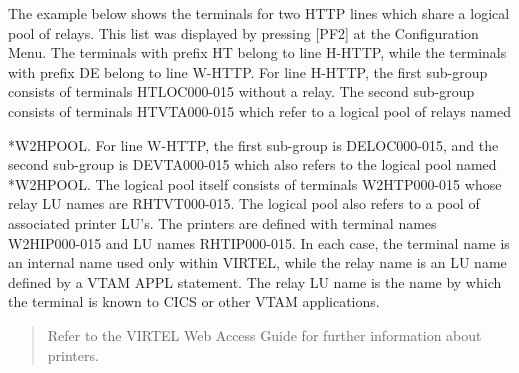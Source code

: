 \documentclass[letterpaper,10pt,english]{sphinxmanual}
\begin{document}
The example below shows the terminals for two HTTP lines which share a logical pool of relays. This list was displayed by pressing {[}PF2{]} at the Configuration Menu. The terminals with prefix HT belong to line H-HTTP, while the terminals with prefix DE belong to line W-HTTP. For line H-HTTP, the first sub-group consists of terminals HTLOC000-015 without a relay. The second sub-group consists of terminals HTVTA000-015 which refer to a logical pool of relays named

*W2HPOOL. For line W-HTTP, the first sub-group is DELOC000-015, and the second sub-group is DEVTA000-015 which also refers to the logical pool named *W2HPOOL. The logical pool itself consists of terminals W2HTP000-015 whose relay LU names are RHTVT000-015. The logical pool also refers to a pool of associated printer LU’s. The printers are defined with
terminal names W2HIP000-015 and LU names RHTIP000-015. In each case, the terminal name is an internal name used only within VIRTEL, while the relay name is an LU name defined by a VTAM APPL statement. The relay LU name is the name by which the terminal is known to CICS or other VTAM applications.










\begin{quote}

Refer to the VIRTEL Web Access Guide for further information about printers.
\end{quote}
\end{document}
